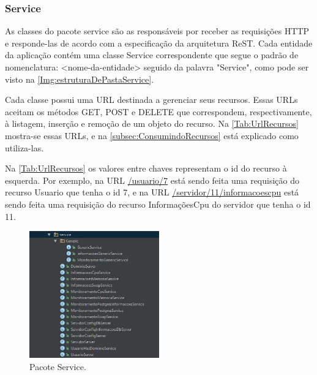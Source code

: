 \subsubsection{Service}\label{subsubsec:Service}

As classes do pacote service são as responsáveis por receber as requisições HTTP e responde-las de acordo com a especificação da arquitetura ReST. Cada entidade da aplicação contém uma classe Service correspondente que segue o padrão de nomenclatura: <nome-da-entidade> seguido da palavra "Service", como pode ser visto na \autoref{Img:estruturaDePastaService}.

Cada classe possui uma URL destinada a gerenciar seus recursos. Essas URLs aceitam os métodos GET, POST e DELETE que correspondem, respectivamente, à listagem, inserção e remoção de um objeto do recurso. Na \autoref{Tab:UrlRecursos} mostra-se essas URLs, e na \autoref{subsec:ConsumindoRecursos} está explicado como utiliza-las.


Na \autoref{Tab:UrlRecursos} os valores entre chaves representam o id do recurso à esquerda. Por exemplo, na URL \url{/usuario/7} está sendo feita uma requisição do recurso Usuario que tenha o id 7, e na URL \url{/servidor/11/informacoescpu} está sendo feita uma requisição do recurso InformaçõesCpu do servidor que tenha o id 11.

\begin{figure}[H]
	\centering
	\includegraphics[width=0.5\textwidth]{figuras/estruturaPojetoService.JPG}
	\caption[Pacote Service.]{Pacote Service.}
	\label{Img:estruturaDePastaService}
\end{figure}


